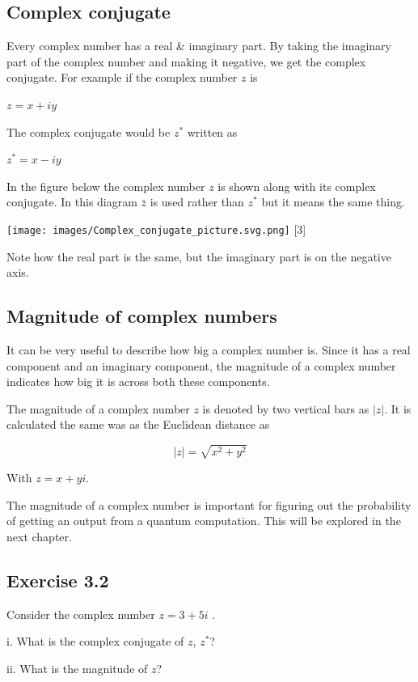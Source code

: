 \documentclass{book}
\begin{document}
\subsection{ Complex conjugate}

Every complex number has a real \& imaginary part. By taking the imaginary part of the complex number and making it negative, we get the complex conjugate. For example if the complex number $z$ is 

$z = x + iy$ 

The complex conjugate would be $z^*$ written as 

$z^* = x - iy$ 

In the figure below the complex number $z$ is shown along with its complex conjugate. In this diagram $\bar{z}$ is used rather than $z^*$ but it means the same thing.  

\texttt{[image: images/Complex\_conjugate\_picture.svg.png]}
 [3]

 Note how the real part is the same, but the imaginary part is on the negative axis. 

 \subsection{ Magnitude of complex numbers }

 It can be very useful to describe how big a complex number is. Since it has a real component and an imaginary component, the magnitude of a complex number indicates how big it is across both these components. 

 The magnitude of a complex number $z$ is denoted by two vertical bars as $|z|$. It is calculated the same was as the Euclidean distance as 

 $$|z| = \sqrt{x^2 + y^2}$$

 With $z = x + yi$. 

 The magnitude of a complex number is important for figuring out the probability of getting an output from a quantum computation. This will be explored in the next chapter.


\subsection{Exercise 3.2}


Consider the complex number $z = 3 + 5i$ . 

i. What is the complex conjugate of $z$, $z^*$?
 
ii. What is the magnitude of $z$?
\end{document}
